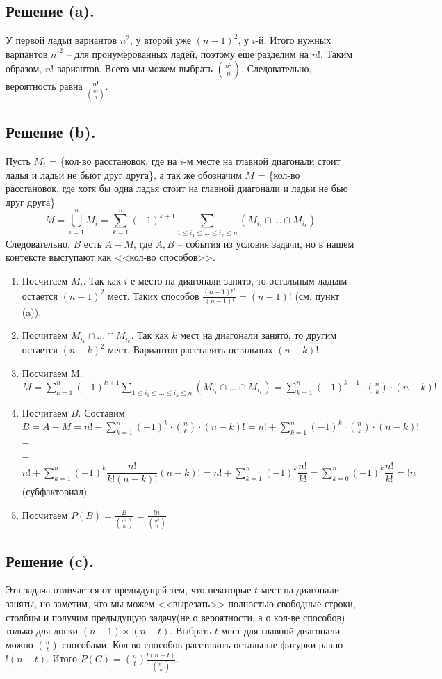 \documentclass[a4paper, 12pt]{article}
\newcommand{\D}{\displaystyle}
\begin{document}
\begin{spacing}{1}
\subsection{Решение (a).}
У первой ладьи вариантов $n^2$, у второй уже $(n-1)^2$, у $i$-й. Итого нужных вариантов $n!^2$ -- для пронумерованных ладей, поэтому еще разделим на $n!$. Таким образом, $n!$ вариантов. Всего мы можем выбрать $\binom{n^2}{n}$. Следовательно, вероятность равна $\D \frac{n!}{\binom{n^2}{n}}$.
\subsection{Решение (b).} Пусть $M_i$ = \{кол-во расстановок, где на $i$-м месте на главной диагонали стоит ладья и ладьи не бьют друг друга\}, а так же обозначим $M$ = \{кол-во расстановок, где хотя бы одна ладья стоит на главной диагонали и ладьи не бью друг друга\} $$M =\bigcup\limits_{i = 1}^{n}M_i= \sum\limits_{k = 1}^{n}(-1)^{k+1}\sum\limits_{1\leq i_1\leq ... \leq i_k \leq n}\left(M_{i_1}\cap...\cap M_{i_k}\right) $$
Следовательно, $B$ есть $A - M$, где $A, B$ -- события из условия задачи, но в нашем контексте выступают как <<кол-во способов>>.\\
\begin{enumerate}
	\item Посчитаем $M_i$. Так как $i$-е место на диагонали занято, то остальным ладьям остается $(n - 1)^2$ мест. Таких способов $\D \frac{(n-1)!^2}{(n-1)!} = (n-1)!$ (см. пункт (a)).
	\item Посчитаем $M_{i_1}\cap...\cap M_{i_k}$. Так как $k$ мест на диагонали занято, то другим остается $(n-k)^2$ мест. Вариантов расставить остальных $(n-k)!$.
	\item Посчитаем M. $M=\sum\limits_{k = 1}^{n}(-1)^{k+1}\sum\limits_{1\leq i_1\leq ... \leq i_k \leq n}\left(M_{i_1}\cap...\cap M_{i_k}\right) = \sum\limits_{k=1}^n (-1)^{k+1}\cdot \binom{n}{k}\cdot(n-k)!$
	\item Посчитаем $B$. Составим $B = A - M = n! - \sum\limits_{k=1}^n (-1)^k\cdot \binom{n}{k}\cdot(n-k)! = n! + \sum\limits_{k=1}^n (-1)^k\cdot \binom{n}{k}\cdot(n-k)!$=\\=
	$n! + \sum\limits_{k=1}^n (-1)^k \dfrac{n!}{k!(n-k)!}(n-k)!=n! + \sum\limits_{k=1}^n (-1)^k \dfrac{n!}{k!} = \sum\limits_{k=0}^n(-1)^k\dfrac{n!}{k!} = !n$ (субфакториал)
	\item Посчитаем $\D P(B) = \frac{B}{\binom{n^2}{n}} = \frac{!n}{\binom{n^2}{n}}$
\end{enumerate}
\subsection{Решение (c).} Эта задача отличается от предыдущей тем, что некоторые $t$ мест на диагонали заняты, но заметим, что мы можем <<вырезать>> полностью свободные строки, столбцы и получим предыдущую задачу(не о вероятности, а о кол-ве способов) только для доски $(n-1) \times (n-t)$. Выбрать $t$ мест для главной диагонали можно $\binom{n}{t}$ способами. Кол-во способов расставить остальные фигурки равно $!(n-t)$. Итого $\D P(C) = \binom{n}{t}\frac{!(n-t)}{\binom{n^2}{n}}$.
\end{spacing}
\end{document}
